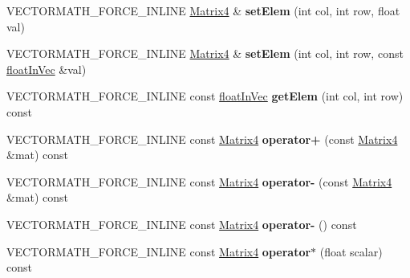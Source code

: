 \begin{DoxyCompactItemize}
V\+E\+C\+T\+O\+R\+M\+A\+T\+H\+\_\+\+F\+O\+R\+C\+E\+\_\+\+I\+N\+L\+I\+NE \hyperlink{classVectormath_1_1Aos_1_1Matrix4}{Matrix4} \& {\bfseries set\+Elem} (int col, int row, float val)
\item 
\mbox{\label{classVectormath_1_1Aos_1_1Matrix4_a08d8650af1af112f288d18201b0b8d27}} 
V\+E\+C\+T\+O\+R\+M\+A\+T\+H\+\_\+\+F\+O\+R\+C\+E\+\_\+\+I\+N\+L\+I\+NE \hyperlink{classVectormath_1_1Aos_1_1Matrix4}{Matrix4} \& {\bfseries set\+Elem} (int col, int row, const \hyperlink{classVectormath_1_1floatInVec}{float\+In\+Vec} \&val)
\item 
\mbox{\label{classVectormath_1_1Aos_1_1Matrix4_a4973ab78a2493bd320b684ac3c63f272}} 
V\+E\+C\+T\+O\+R\+M\+A\+T\+H\+\_\+\+F\+O\+R\+C\+E\+\_\+\+I\+N\+L\+I\+NE const \hyperlink{classVectormath_1_1floatInVec}{float\+In\+Vec} {\bfseries get\+Elem} (int col, int row) const
\item 
\mbox{\label{classVectormath_1_1Aos_1_1Matrix4_a6d89608a7e82d5e97f6cd438ab17aaad}} 
V\+E\+C\+T\+O\+R\+M\+A\+T\+H\+\_\+\+F\+O\+R\+C\+E\+\_\+\+I\+N\+L\+I\+NE const \hyperlink{classVectormath_1_1Aos_1_1Matrix4}{Matrix4} {\bfseries operator+} (const \hyperlink{classVectormath_1_1Aos_1_1Matrix4}{Matrix4} \&mat) const
\item 
\mbox{\label{classVectormath_1_1Aos_1_1Matrix4_a615460f8f372b5ce6031f83ab02b18d8}} 
V\+E\+C\+T\+O\+R\+M\+A\+T\+H\+\_\+\+F\+O\+R\+C\+E\+\_\+\+I\+N\+L\+I\+NE const \hyperlink{classVectormath_1_1Aos_1_1Matrix4}{Matrix4} {\bfseries operator-\/} (const \hyperlink{classVectormath_1_1Aos_1_1Matrix4}{Matrix4} \&mat) const
\item 
\mbox{\label{classVectormath_1_1Aos_1_1Matrix4_ac46317ff5fdd1c7cec5366d6fb190f0c}} 
V\+E\+C\+T\+O\+R\+M\+A\+T\+H\+\_\+\+F\+O\+R\+C\+E\+\_\+\+I\+N\+L\+I\+NE const \hyperlink{classVectormath_1_1Aos_1_1Matrix4}{Matrix4} {\bfseries operator-\/} () const
\item 
\mbox{\label{classVectormath_1_1Aos_1_1Matrix4_a738b86812ce9dc86b949c73eee0453c0}} 
V\+E\+C\+T\+O\+R\+M\+A\+T\+H\+\_\+\+F\+O\+R\+C\+E\+\_\+\+I\+N\+L\+I\+NE const \hyperlink{classVectormath_1_1Aos_1_1Matrix4}{Matrix4} {\bfseries operator$\ast$} (float scalar) const

\end{DoxyCompactItemize}
